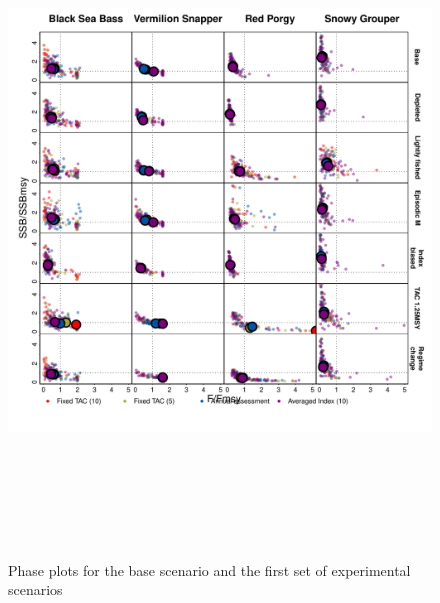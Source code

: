 \documentclass[12pt,english]{article}
\begin{document}
\begin{figure}[!ht]
\begin{center}
\includegraphics[width=6in,height=7in]{../Figs/phasePlot1.pdf}
\end{center}
\begin{flushleft}
\caption{Phase plots for the base scenario and the first set of experimental scenarios}
\label{fig:phasePlot1}
\end{flushleft}
\end{figure}



%
%
%
% 
%
% 
%


\end{document}
